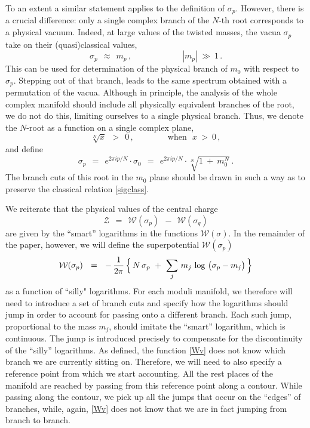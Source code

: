 \documentclass[epsfig,12pt]{article}
\def\beq{\begin{equation}}
\def\eeq{\end{equation}}
\def\beq{\begin{equation}}
\def\eeq{\end{equation}}
\newcommand{\mc}[1]{\mathcal{#1}}
\newcommand{\W}{\mathcal{W}}
\begin{document}
	To an extent a similar statement applies to the definition of $ \sigma_p $.
	However, there is a crucial difference: only a single complex branch of the $ N $-th root corresponds
	to a physical vacuum.
	Indeed, at large values of the twisted masses, the vacua $ \sigma_p $ take on their (quasi)classical values,
\beq
\label{sigclass}
	\sigma_p  ~~\approx~~ m_p\,,  \qquad\qquad\qquad |m_p| ~\gg~ 1\,.
\eeq
	This can be used for determination of the physical branch of $ m_0 $ with respect to $ \sigma_p $.
	Stepping out of that branch, leads to the same spectrum obtained with a permutation of the vacua.
	Although in principle, the analysis of the whole complex manifold should include 
	all physically equivalent branches of the root, we do not do this, 
	limiting ourselves to a single physical branch.
	Thus, we denote the $ N $-root as a function on a single complex plane,  
\beq
	\sqrt[N]{x} ~~>~~ 0\,, \qquad\qquad \text{when~~} x ~>~ 0\,,
\eeq
	and define
\beq
	\sigma_p ~~=~~ e^{2 \pi i p / N} \cdot \sigma_0 ~~=~~ e^{2 \pi i p / N} \cdot \sqrt[N]{ 1 ~+~ m_0^N }\,.
\eeq
	The branch cuts of this root in the $ m_0 $ plane should be drawn in such a way as to preserve
	the classical relation \eqref{sigclass}.
	

	We reiterate that the physical values of the central charge 
\beq
\label{ccharge}
	\mc{Z} ~~=~~ \W(\sigma_p) ~~-~~ \W(\sigma_q)
\eeq
	are given by the ``smart'' logarithms in the functions $ \W(\sigma) $.
	In the remainder  of the paper, however, we will define the superpotential $ \W(\sigma_p) $
\beq
\label{Wv}
	\W ( \sigma_p ) ~~=~~ 
		-\, \frac{1}{2\pi}\,  
                \Bigl\{\, N\, \sigma_p ~+~ \sum_j\, m_j\, \log\, \big( \sigma_p - m_j \big) \,\Bigr\}
\eeq
as a function 
	  of   ``silly" logarithms. 
	For each moduli manifold, we therefore will need to introduce a set of branch cuts and 
	specify how the logarithms should jump in order to account for passing onto a different branch.
	Each such jump, proportional to the mass $ m_j $, should imitate the ``smart'' logarithm,
	which is continuous.
	The jump is introduced precisely to compensate for the discontinuity of the ``silly'' logarithms.
	As defined, the function \eqref{Wv} does not know which branch we are currently sitting on.
	Therefore, we will need to also specify a reference point from which we start accounting.
	All the rest places of the manifold are reached by passing from this reference point along a contour.
	While passing along the contour, we pick up all the jumps that occur on the ``edges'' of 
	branches, while, again, \eqref{Wv} does not know that we are in fact jumping from
	branch to branch.
\end{document}
